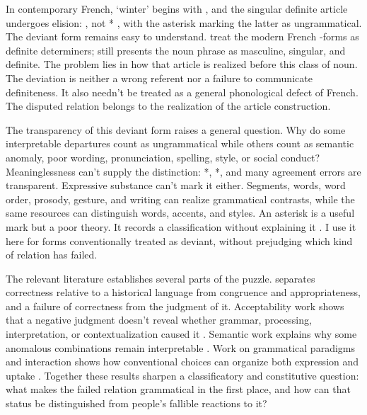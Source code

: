 \documentclass[12pt,letterpaper]{article}
\begin{document}
In contemporary French,  `winter' begins with
 \citep{oqlf2021hmuet}, and the singular definite article undergoes
elision: , not *
\citep[1990--1991, 1994]{boersma2007}, with the asterisk marking the latter as
ungrammatical. The
deviant form remains easy to understand.
\textcite[395--398]{simonenkocarlier2020} treat the modern French -forms as
definite determiners;  still presents the noun phrase as masculine,
singular, and definite. The problem lies in how that article is realized before
this class of noun. The deviation is neither a wrong referent nor a failure to
communicate definiteness. It also needn't be treated as a general phonological
defect of French. The disputed relation belongs to the realization of the
article construction.

The transparency of this deviant form raises a general question. Why do some
interpretable departures count as ungrammatical while others count as semantic anomaly, poor wording,
pronunciation, spelling, style, or social conduct? Meaninglessness can't supply the
distinction: *, *, and many agreement errors are
transparent. Expressive substance can't mark it either. Segments, words, word
order, prosody, gesture, and writing can realize grammatical contrasts, while the
same resources can distinguish words, accents, and styles. An asterisk is a
useful mark but a poor theory. It records a classification without explaining it
\citep[compare][37]{coseriu2019}.
I use it here for forms conventionally treated as deviant, without prejudging
which kind of relation has failed.

The relevant literature establishes several parts of the puzzle.
\textcite[32--39, 98--101]{coseriu2019} separates correctness relative to a
historical language from congruence and appropriateness, and a failure of
correctness from the judgment of it. Acceptability
work shows that a negative judgment
doesn't reveal whether grammar, processing, interpretation, or contextualization
caused it \citep{hofmeisteretal2013source,leivadawestergaard2020}. Semantic work
explains why some anomalous combinations remain interpretable
\citep{abrusan2019,abrusanetal2021shift}. Work on grammatical paradigms and
interaction shows how conventional choices can organize both expression and
uptake \citep{norgardsorensenheltoft2015,foxetal1996repair}. Together these results
sharpen a classificatory and constitutive question: what makes the failed relation
grammatical in the first place, and how can that status be distinguished from
people's fallible reactions to it?
\end{document}
